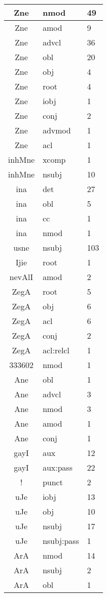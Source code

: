 \documentclass[a4 paper]{article}
\begin{document}
\begin{longtable}{cp{}p{}}
Zne & nmod & 49\\ \midrule Zne & amod & 9\\ \midrule Zne & advcl & 36\\ \midrule Zne & obl & 20\\ \midrule Zne & obj & 4\\ \midrule Zne & root & 4\\ \midrule Zne & iobj & 1\\ \midrule Zne & conj & 2\\ \midrule Zne & advmod & 1\\ \midrule Zne & acl & 1\\ \midrule 
inhMne & xcomp & 1\\ \midrule inhMne & nsubj & 10\\ \midrule 
ina & det & 27\\ \midrule ina & obl & 5\\ \midrule ina & cc & 1\\ \midrule ina & nmod & 1\\ \midrule 
usne & nsubj & 103\\ \midrule 
Ijie & root & 1\\ \midrule 
nevAlI & amod & 2\\ \midrule 
ZegA & root & 5\\ \midrule ZegA & obj & 6\\ \midrule ZegA & acl & 6\\ \midrule ZegA & conj & 2\\ \midrule ZegA & acl:relcl & 1\\ \midrule 
333602 & nmod & 1\\ \midrule 
Ane & obl & 1\\ \midrule Ane & advcl & 3\\ \midrule Ane & nmod & 3\\ \midrule Ane & amod & 1\\ \midrule Ane & conj & 1\\ \midrule 
gayI & aux & 12\\ \midrule gayI & aux:pass & 22\\ \midrule 
! & punct & 2\\ \midrule 
uJe & iobj & 13\\ \midrule uJe & obj & 10\\ \midrule uJe & nsubj & 17\\ \midrule uJe & nsubj:pass & 1\\ \midrule 
ArA & nmod & 14\\ \midrule ArA & nsubj & 2\\ \midrule ArA & obl & 1\\ \midrule 

\end{longtable}
\end{document}
